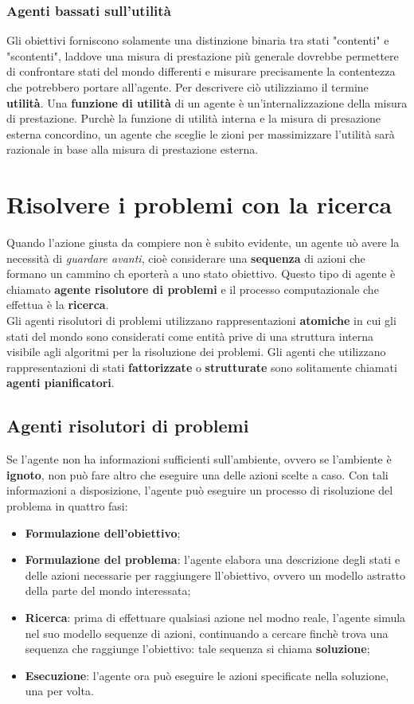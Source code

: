 \documentclass{article}
\begin{document}
\subsubsection{Agenti bassati sull'utilità}
Gli obiettivi forniscono solamente una distinzione binaria tra stati "contenti" e "scontenti", laddove una misura di prestazione più generale dovrebbe permettere di confrontare stati del mondo differenti e misurare precisamente la contentezza che potrebbero portare all'agente. Per descrivere ciò utilizziamo il termine \textbf{utilità}.
Una \textbf{funzione di utilità} di un agente è un'internalizzazione della misura di prestazione. Purchè la funzione di utilità interna e la misura di presazione esterna concordino, un agente che sceglie le zioni per massimizzare l'utilità sarà razionale in base alla misura di prestazione esterna.

\section{Risolvere i problemi con la ricerca}
Quando l'azione giusta da compiere non è subito evidente, un agente uò avere la necessità di \textit{guardare avanti}, cioè considerare una \textbf{sequenza} di azioni che formano un cammino ch eporterà a uno stato obiettivo. Questo tipo di agente è chiamato \textbf{agente risolutore di problemi} e il processo computazionale che effettua è la \textbf{ricerca}. \\ Gli agenti risolutori di problemi utilizzano rappresentazioni \textbf{atomiche} in cui gli stati del mondo sono considerati come entità prive di una struttura interna visibile agli algoritmi per la risoluzione dei problemi. Gli agenti che utilizzano rappresentazioni di stati \textbf{fattorizzate} o \textbf{strutturate} sono solitamente chiamati \textbf{agenti pianificatori}.
\subsection{Agenti risolutori di problemi}
Se l'agente non ha informazioni sufficienti sull'ambiente, ovvero se l'ambiente è \textbf{ignoto}, non può fare altro che eseguire una delle azioni scelte a caso. Con tali informazioni a disposizione, l'agente può eseguire un processo di risoluzione del problema in quattro fasi:
\begin{itemize}
    \item \textbf{Formulazione dell'obiettivo};
    \item \textbf{Formulazione del problema}: l'agente elabora una descrizione degli stati e delle azioni necessarie per raggiungere ll'obiettivo, ovvero un modello astratto della parte del mondo interessata;
    \item \textbf{Ricerca}: prima di effettuare qualsiasi azione nel modno reale, l'agente simula nel suo modello sequenze di azioni, continuando a cercare finchè trova una sequenza che raggiunge l'obiettivo: tale sequenza si chiama \textbf{soluzione};
    \item \textbf{Esecuzione}: l'agente ora può eseguire le azioni specificate nella soluzione, una per volta.
\end{itemize}
\end{document}
